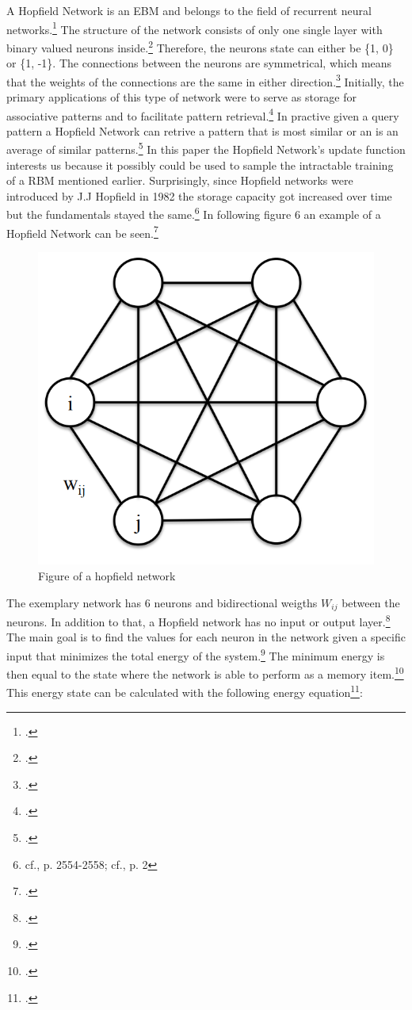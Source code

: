 A Hopfield Network is an \ac{EBM} and belongs to the field of recurrent neural networks.\footcite[cf.][35]{dramschChapterOne702020}
The structure of the network consists of only one single layer with binary valued neurons inside.\footcite[cf.][7]{ahadNeuralNetworksWireless2016}
Therefore, the neurons state can either be \{1, 0\} or \{1, -1\}.
The connections between the neurons are symmetrical, which means that the weights of the connections are the same in either direction.\footcite[cf.][7]{ahadNeuralNetworksWireless2016}
Initially, the primary applications of this type of network were to serve as storage for associative patterns and to facilitate pattern retrieval.\footcite[cf.][2]{ramsauerHopfieldNetworksAll2021}
In practive given a query pattern a Hopfield Network can retrive a pattern that is most similar or an is an average of similar patterns.\footcite[cf.][2]{ramsauerHopfieldNetworksAll2021}
In this paper the Hopfield Network's update function interests us because it possibly could be used to sample the intractable training of a \ac{RBM} mentioned earlier.
Surprisingly, since Hopfield networks were introduced by J.J Hopfield in 1982 the storage capacity got increased over time but the fundamentals stayed the same.\footnote{cf.\cite{hopfieldNeuralNetworksPhysical1982}, p. 2554-2558; cf.\cite{ramsauerHopfieldNetworksAll2021}, p. 2}
In following figure 6 an example of a Hopfield Network can be seen.\footcite[cf.][1-2]{yaoMassivelyParallelAssociative2013}

\begin{figure}[H]
    \centering
    \includegraphics[width=0.3\linewidth]{graphics/Hopfield_Netzwerk.png}
    \caption{Figure of a hopfield network}
\end{figure}
The exemplary network has 6 neurons and bidirectional weigths \( W_{ij} \) between the neurons. 
In addition to that, a Hopfield network has no input or output layer.\footcite[cf.][3]{yaoMassivelyParallelAssociative2013}
The main goal is to find the values for each neuron in the network given a specific input that minimizes the total energy of the system.\footcite[cf.][7]{ahadNeuralNetworksWireless2016}
The minimum energy is then equal to the state where the network is able to perform as a memory item.\footcite[cf.][7]{ahadNeuralNetworksWireless2016}
This energy state can be calculated with the following energy equation\footcite[cf.][2556]{hopfieldNeuralNetworksPhysical1982}: 

